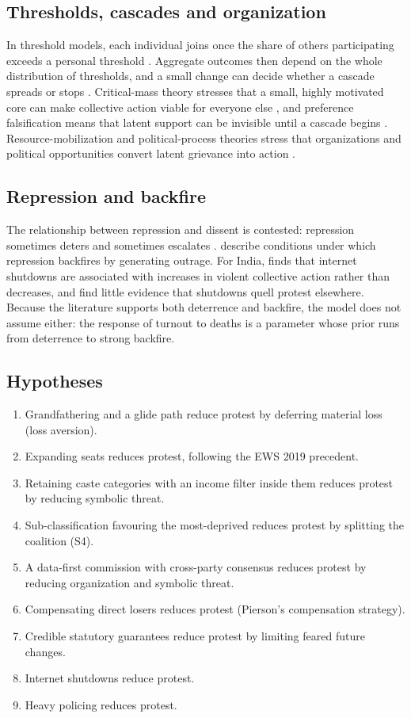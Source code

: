 \documentclass[11pt,a4paper]{article}
\begin{document}
\subsection{Thresholds, cascades and organization}
In threshold models, each individual joins once the share of others participating exceeds a personal threshold \citep{granovetter1978,schelling1978}. Aggregate outcomes then depend on the whole distribution of thresholds, and a small change can decide whether a cascade spreads or stops \citep{watts2002}. Critical-mass theory stresses that a small, highly motivated core can make collective action viable for everyone else \citep{marwell1993}, and preference falsification means that latent support can be invisible until a cascade begins \citep{kuran1991}. Resource-mobilization and political-process theories stress that organizations and political opportunities convert latent grievance into action \citep{mccarthy1977,mcadam1982,tarrow1994}.

\subsection{Repression and backfire}
The relationship between repression and dissent is contested: repression sometimes deters and sometimes escalates \citep{lichbach1987,davenport2007}. \citet{hess2006} describe conditions under which repression backfires by generating outrage. For India, \citet{rydzak2019} finds that internet shutdowns are associated with increases in violent collective action rather than decreases, and \citet{rydzak2020} find little evidence that shutdowns quell protest elsewhere. Because the literature supports both deterrence and backfire, the model does not assume either: the response of turnout to deaths is a parameter whose prior runs from deterrence to strong backfire.

\subsection{Hypotheses}
\begin{enumerate}[label=\textbf{H\arabic*.}]
\item Grandfathering and a glide path reduce protest by deferring material loss (loss aversion).
\item Expanding seats reduces protest, following the EWS 2019 precedent.
\item Retaining caste categories with an income filter inside them reduces protest by reducing symbolic threat.
\item Sub-classification favouring the most-deprived reduces protest by splitting the coalition (S4).
\item A data-first commission with cross-party consensus reduces protest by reducing organization and symbolic threat.
\item Compensating direct losers reduces protest (Pierson's compensation strategy).
\item Credible statutory guarantees reduce protest by limiting feared future changes.
\item Internet shutdowns reduce protest.
\item Heavy policing reduces protest.
\end{enumerate}
\end{document}
